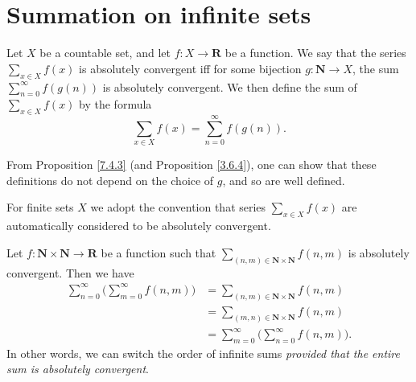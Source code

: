 \section{Summation on infinite sets}\label{sec 8.2}

\begin{definition}\label{8.2.1}
Let \(X\) be a countable set, and let \(f : X \to \mathbf{R}\) be a function.
We say that the series \(\sum_{x \in X} f(x)\) is absolutely convergent iff for some bijection \(g : \mathbf{N} \to X\), the sum \(\sum_{n = 0}^\infty f(g(n))\) is absolutely convergent.
We then define the sum of \(\sum_{x \in X} f(x)\) by the formula
\[
    \sum_{x \in X} f(x) = \sum_{n = 0}^\infty f(g(n)).
\]
\end{definition}

\begin{note}
From Proposition \ref{7.4.3} (and Proposition \ref{3.6.4}), one can show that these definitions do not depend on the choice of \(g\), and so are well defined.
\end{note}

\begin{note}
For finite sets \(X\) we adopt the convention that series \(\sum_{x \in X} f(x)\) are automatically considered to be absolutely convergent.
\end{note}

\begin{theorem}\label{8.2.2}
Let \(f : \mathbf{N} \times \mathbf{N} \to \mathbf{R}\) be a function such that \(\sum_{(n, m) \in \mathbf{N} \times \mathbf{N}} f(n, m)\) is absolutely convergent.
Then we have
\begin{align*}
\sum_{n = 0}^\infty \bigg(\sum_{m = 0}^\infty f(n, m)\bigg) &= \sum_{(n, m) \in \mathbf{N} \times \mathbf{N}} f(n, m) \\
&= \sum_{(m, n) \in \mathbf{N} \times \mathbf{N}} f(n, m) \\
&= \sum_{m = 0}^\infty \bigg(\sum_{n = 0}^\infty f(n, m)\bigg).
\end{align*}
In other words, we can switch the order of infinite sums \emph{provided that the entire sum is absolutely convergent}.
\end{theorem}

